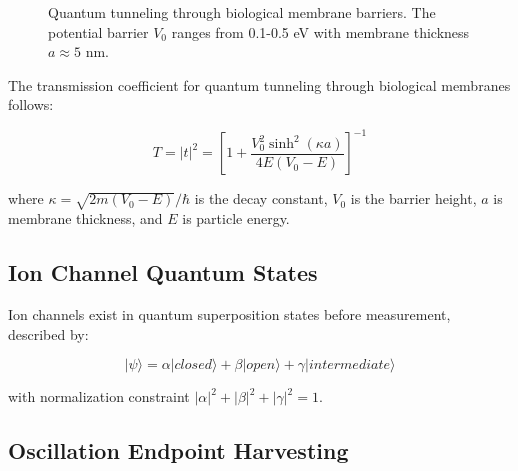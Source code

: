\documentclass[12pt,a4paper]{article}
\begin{document}
\begin{figure}[H]
\centering
{}
\caption{Quantum tunneling through biological membrane barriers. The potential barrier $V_0$ ranges from 0.1-0.5 eV with membrane thickness $a \approx 5$ nm.}
\label{fig:membrane_tunneling}
\end{figure}

The transmission coefficient for quantum tunneling through biological membranes follows:

\begin{equation}
T = |t|^2 = \left[1 + \frac{V_0^2\sinh^2(\kappa a)}{4E(V_0-E)}\right]^{-1}
\label{eq:transmission}
\end{equation}

where $\kappa = \sqrt{2m(V_0-E)}/\hbar$ is the decay constant, $V_0$ is the barrier height, $a$ is membrane thickness, and $E$ is particle energy.

\subsection{Ion Channel Quantum States}

Ion channels exist in quantum superposition states before measurement, described by:

\begin{equation}
|\psi\rangle = \alpha|closed\rangle + \beta|open\rangle + \gamma|intermediate\rangle
\label{eq:superposition}
\end{equation}

with normalization constraint $|\alpha|^2 + |\beta|^2 + |\gamma|^2 = 1$.

\subsection{Oscillation Endpoint Harvesting}
\end{document}
